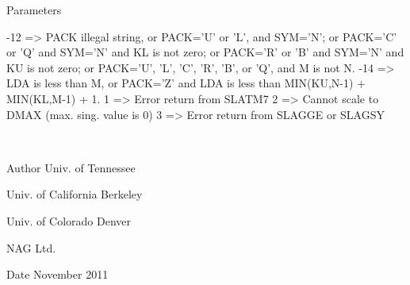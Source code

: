 \begin{DoxyParams}[1]{Parameters}
\begin{DoxyVerb}
           -12 => PACK illegal string, or PACK='U' or 'L', and SYM='N';
                  or PACK='C' or 'Q' and SYM='N' and KL is not zero;
                  or PACK='R' or 'B' and SYM='N' and KU is not zero;
                  or PACK='U', 'L', 'C', 'R', 'B', or 'Q', and M is not
                  N.
           -14 => LDA is less than M, or PACK='Z' and LDA is less than
                  MIN(KU,N-1) + MIN(KL,M-1) + 1.
            1  => Error return from SLATM7
            2  => Cannot scale to DMAX (max. sing. value is 0)
            3  => Error return from SLAGGE or SLAGSY\end{DoxyVerb}
 \\
\hline
\end{DoxyParams}
\begin{DoxyAuthor}{Author}
Univ. of Tennessee 

Univ. of California Berkeley 

Univ. of Colorado Denver 

N\+A\+G Ltd. 
\end{DoxyAuthor}
\begin{DoxyDate}{Date}
November 2011 
\end{DoxyDate}
